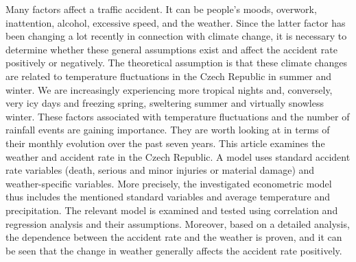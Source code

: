 
\begin{Abstrakt}
    Many factors affect a traffic accident. It can be people's moods, overwork, inattention, alcohol, excessive speed, and the weather. Since the latter factor has been changing a lot recently in connection with climate change, it is necessary to determine whether these general assumptions exist and affect the accident rate positively or negatively. The theoretical assumption is that these climate changes are related to temperature fluctuations in the Czech Republic in summer and winter. We are increasingly experiencing more tropical nights and, conversely, very icy days and freezing spring, sweltering summer and virtually snowless winter. These factors associated with temperature fluctuations and the number of rainfall events are gaining importance. They are worth looking at in terms of their monthly evolution over the past seven years. This article examines the weather and accident rate in the Czech Republic. A model uses standard accident rate variables (death, serious and minor injuries or material damage) and weather-specific variables. More precisely, the investigated econometric model thus includes the mentioned standard variables and average temperature and precipitation. The relevant model is examined and tested using correlation and regression analysis and their assumptions. Moreover, based on a detailed analysis, the dependence between the accident rate and the weather is proven, and it can be seen that the change in weather generally affects the accident rate positively.
\end{Abstrakt}



\clearpage
